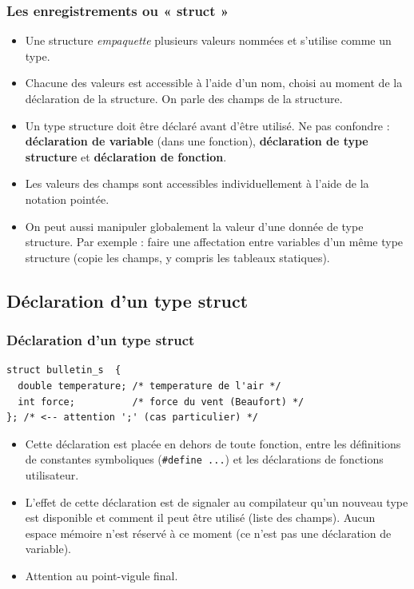 \documentclass[xcolor=pdftex,svgnames,table]{beamer}
\begin{document}
\begin{frame}
  \frametitle{Les enregistrements ou  « struct »}
\begin{itemize}
\item Une structure \emph{empaquette} plusieurs valeurs nommées et s'utilise comme un \alert{type}. \pause
\item Chacune des valeurs est accessible à l'aide d'un nom, choisi au
  moment de  la  déclaration de la structure. On parle des \alert{champs} de la
  structure.\pause
\item Un type structure doit être déclaré avant d'être
  utilisé. Ne pas confondre : \textbf{déclaration de variable} (dans une
  fonction), \textbf{déclaration de type structure} et  \textbf{déclaration de fonction}.
\pause
\item Les valeurs des champs sont accessibles individuellement à l'aide de la
  \alert{notation pointée}. \pause
\item On peut aussi manipuler globalement la valeur d'une donnée de
  type structure. Par exemple : faire une affectation entre variables
  d'un même type structure (copie les champs, y compris les tableaux statiques).
\end{itemize}
\end{frame}

\subsection[Déclaration]{Déclaration d'un type struct}
\begin{frame}[fragile]
  \frametitle{Déclaration d'un type struct}
\begin{lstlisting}[escapechar={\%},basicstyle=\ttfamily\small]
struct bulletin_s  {
  double temperature; /* temperature de l'air */
  int force;          /* force du vent (Beaufort) */
}; /* <-- attention ';' (cas particulier) */
\end{lstlisting}
\pause
\begin{itemize}
\item Cette déclaration est placée en dehors de toute fonction, entre
les définitions de constantes symboliques (\verb|#define ...|) et les
déclarations de fonctions utilisateur.
\pause
\item L'effet de cette déclaration est de signaler au compilateur qu'un nouveau
type est disponible et comment il peut être utilisé (liste des champs). Aucun espace mémoire n'est réservé à ce moment
(ce n'est pas une déclaration de variable).
\item \pause \alert{Attention au point-vigule final}.
\end{itemize}
\end{frame}
\end{document}
